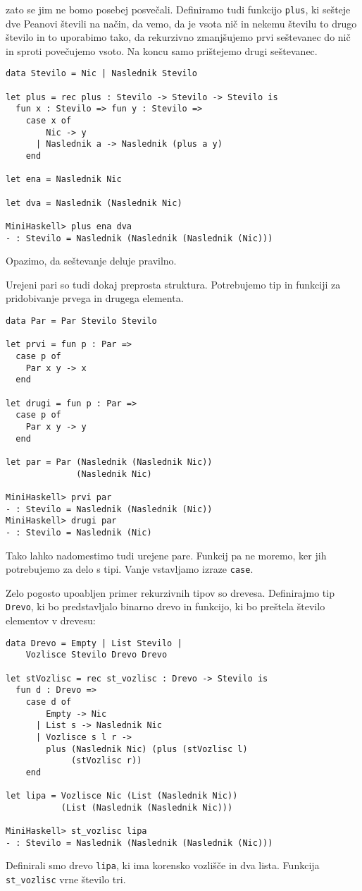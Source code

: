 \documentclass[12pt,a4paper,openany]{book}
\begin{document}
zato se jim ne bomo posebej posvečali. Definiramo tudi funkcijo \lstinline{plus}, ki sešteje dve Peanovi števili na način, da vemo, da je vsota nič in nekemu številu to drugo število in to uporabimo tako, da rekurzivno 
zmanjšujemo prvi seštevanec do nič in sproti povečujemo vsoto. Na koncu samo prištejemo drugi seštevanec.
\begin{lstlisting}
data Stevilo = Nic | Naslednik Stevilo

let plus = rec plus : Stevilo -> Stevilo -> Stevilo is
  fun x : Stevilo => fun y : Stevilo =>
    case x of
        Nic -> y
      | Naslednik a -> Naslednik (plus a y)
    end

let ena = Naslednik Nic

let dva = Naslednik (Naslednik Nic)

MiniHaskell> plus ena dva
- : Stevilo = Naslednik (Naslednik (Naslednik (Nic)))
\end{lstlisting}
Opazimo, da seštevanje deluje pravilno. 

Urejeni pari so tudi dokaj preprosta struktura. Potrebujemo tip in funkciji za pridobivanje prvega in drugega elementa.
\begin{lstlisting}
data Par = Par Stevilo Stevilo

let prvi = fun p : Par =>
  case p of 
    Par x y -> x
  end

let drugi = fun p : Par =>
  case p of 
    Par x y -> y
  end

let par = Par (Naslednik (Naslednik Nic)) 
              (Naslednik Nic)

MiniHaskell> prvi par
- : Stevilo = Naslednik (Naslednik (Nic))
MiniHaskell> drugi par
- : Stevilo = Naslednik (Nic)
\end{lstlisting}
Tako lahko nadomestimo tudi urejene pare. Funkcij pa ne moremo, ker jih potrebujemo za delo s tipi. Vanje vstavljamo izraze \lstinline{case}. 

Zelo pogosto upoabljen primer rekurzivnih tipov so drevesa. Definirajmo tip \lstinline{Drevo}, ki bo predstavljalo binarno drevo in funkcijo, ki bo preštela število elementov v drevesu:
\begin{lstlisting}	
data Drevo = Empty | List Stevilo | 
    Vozlisce Stevilo Drevo Drevo

let stVozlisc = rec st_vozlisc : Drevo -> Stevilo is
  fun d : Drevo =>
    case d of
        Empty -> Nic
      | List s -> Naslednik Nic
      | Vozlisce s l r ->
        plus (Naslednik Nic) (plus (stVozlisc l) 
             (stVozlisc r))
    end

let lipa = Vozlisce Nic (List (Naslednik Nic)) 
           (List (Naslednik (Naslednik Nic)))

MiniHaskell> st_vozlisc lipa
- : Stevilo = Naslednik (Naslednik (Naslednik (Nic)))
\end{lstlisting}
Definirali smo drevo \lstinline{lipa}, ki ima korensko vozlišče in dva lista. Funkcija \lstinline{st_vozlisc} vrne število tri.
\end{document}
